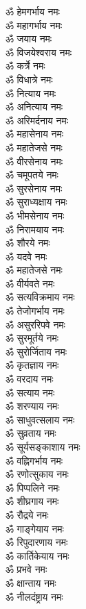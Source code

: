 \begin{multicols}{2}
\begin{flushleft}
ॐ हेमगर्भाय नमः\\
ॐ महागर्भाय नमः\\
ॐ जयाय नमः\hfill{}\\
ॐ विजयेश्वराय नमः\\
ॐ कर्त्रे नमः\\
ॐ विधात्रे नमः\\
ॐ नित्याय नमः\\
ॐ अनित्याय नमः\\
ॐ अरिमर्दनाय नमः\\
ॐ महासेनाय नमः\\
ॐ महातेजसे नमः\\
ॐ वीरसेनाय नमः\\
ॐ चमूपतये नमः\hfill{}\\
ॐ सुरसेनाय नमः\\
ॐ सुराध्यक्षाय नमः\\
ॐ भीमसेनाय नमः\\
ॐ निरामयाय नमः\\
ॐ शौरये नमः\\
ॐ यदवे नमः\\
ॐ महातेजसे नमः\\
ॐ वीर्यवते नमः\\
ॐ सत्यविक्रमाय नमः\\
ॐ तेजोगर्भाय नमः\hfill{}\\
ॐ असुररिपवे नमः\\
ॐ सुरमूर्तये नमः\\
ॐ सुरोर्जिताय नमः\\
ॐ कृतज्ञाय नमः\\
ॐ वरदाय नमः\\
ॐ सत्याय नमः\\
ॐ शरण्याय नमः\\
ॐ साधुवत्सलाय नमः\\
ॐ सुव्रताय नमः\\
ॐ सूर्यसङ्काशाय नमः\hfill{}\\
ॐ वह्निगर्भाय नमः\\
ॐ रणोत्सुकाय नमः\\
ॐ पिप्पलिने नमः\\
ॐ शीघ्रगाय नमः\\
ॐ रौद्रये नमः\\
ॐ गाङ्गेयाय नमः\\
ॐ रिपुदारणाय नमः\\
ॐ कार्तिकेयाय नमः\\
ॐ प्रभवे नमः\\
ॐ क्षान्ताय नमः\hfill{}\\
ॐ नीलदंष्ट्राय नमः\\

\end{flushleft}
\end{multicols}
